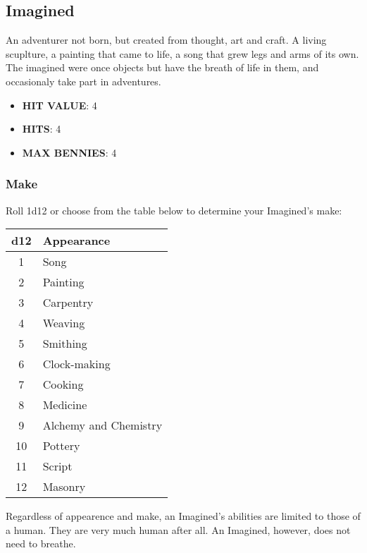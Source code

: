 \newpage
\subsection{Imagined}
An adventurer not born, but created from thought, art and craft. A living scuplture, a painting that came to life, a song that grew legs and arms of its own. The imagined were once objects but have the breath of life in them, and occasionaly take part in adventures.

\begin{multicols}{2}
    \begin{itemize}
      \item \textbf{HIT VALUE}: 4
      \item \textbf{HITS}: 4
      \item \textbf{MAX BENNIES}: 4
    \end{itemize}

    \subsubsection*{Make}
    Roll 1d12 or choose from the table below to determine your Imagined's make:
    
    \begin{adjustbox}{width=0.55\columnwidth,center}
    \begin{tabular}{|c|l|}
    \hline
    \textbf{d12} & \textbf{Appearance} \\
    \hline
    1 & Song \\
    2 & Painting \\
    3 & Carpentry \\
    4 & Weaving \\
    5 & Smithing \\
    6 & Clock-making \\
    7 & Cooking \\
    8 & Medicine \\
    9 & Alchemy and Chemistry \\
    10 & Pottery \\
    11 & Script \\
    12 & Masonry \\
    \hline
    \end{tabular}
    \end{adjustbox}
    
    Regardless of appearence and make, an Imagined's abilities are limited to those of a human. They are very much human after all. An Imagined, however, does not need to breathe.
    

\end{multicols}
